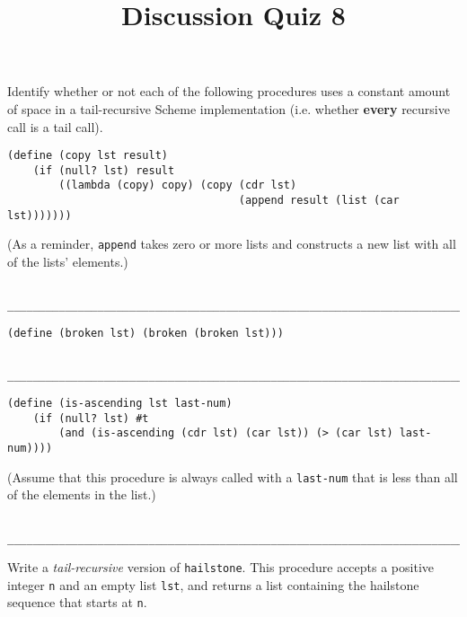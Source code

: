 \documentclass[twoside]{article}
\title{\sc Discussion Quiz 8 \solution{Solutions}}
\begin{document}
\thispagestyle{empty}
\maketitle

\begin{enumerate}

Identify whether or not each of the following procedures uses a constant amount of space in a tail-recursive Scheme implementation (i.e. whether \textbf{every} recursive call is a tail call).

\begin{lstlisting}
(define (copy lst result)
    (if (null? lst) result
        ((lambda (copy) copy) (copy (cdr lst)
                                    (append result (list (car lst)))))))
\end{lstlisting}

(As a reminder, {\tt append} takes zero or more lists and constructs a new list with all of the lists' elements.)
\begin{lstlisting}

__________________________________________________________________________
\end{lstlisting}

\begin{lstlisting}
(define (broken lst) (broken (broken lst)))
\end{lstlisting}
\begin{lstlisting}

__________________________________________________________________________
\end{lstlisting}

\begin{lstlisting}
(define (is-ascending lst last-num)
    (if (null? lst) #t
        (and (is-ascending (cdr lst) (car lst)) (> (car lst) last-num))))
\end{lstlisting}

(Assume that this procedure is always called with a {\tt last-num} that is less than all of the elements in the list.)
\begin{lstlisting}

__________________________________________________________________________
\end{lstlisting}


Write a \emph{tail-recursive} version of {\tt hailstone}. This procedure accepts a positive integer {\tt n} and an empty list {\tt lst}, and returns a list containing the hailstone sequence that starts at {\tt n}.


\end{enumerate}
\end{document}
